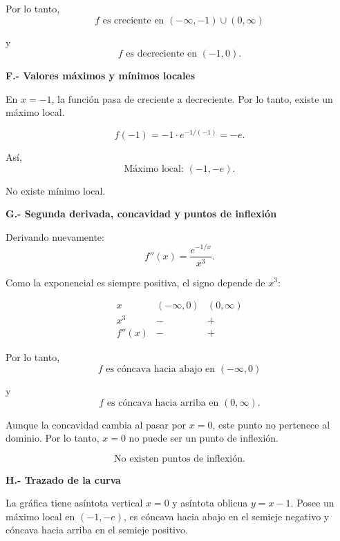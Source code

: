 \documentclass[12pt]{article}
\begin{document}
\begin{enumerate}[label=\alph*.-]
    Por lo tanto,
    \[
    \boxed{
    f\text{ es creciente en }(-\infty,-1)\cup(0,\infty)
    }
    \]

    y
    \[
    \boxed{
    f\text{ es decreciente en }(-1,0).
    }
    \]

    \textbf{F.- Valores máximos y mínimos locales}

    En $x=-1$, la función pasa de creciente a decreciente. Por lo tanto,
    existe un máximo local.

    \[
    f(-1)
    =
    -1\cdot e^{-1/(-1)}
    =
    -e.
    \]

    Así,
    \[
    \boxed{
    \text{Máximo local: }(-1,-e)
    }.
    \]

    No existe mínimo local.

    \textbf{G.- Segunda derivada, concavidad y puntos de inflexión}

    Derivando nuevamente:
    \[
    f''(x)=\frac{e^{-1/x}}{x^3}.
    \]

    Como la exponencial es siempre positiva, el signo depende de $x^3$:

    \[
    \begin{array}{c|cc}
    x & (-\infty,0) & (0,\infty)\\
    \hline
    x^3 & - & +\\
    \hline
    f''(x) & - & +
    \end{array}
    \]

    Por lo tanto,
    \[
    \boxed{
    f\text{ es cóncava hacia abajo en }(-\infty,0)
    }
    \]

    y
    \[
    \boxed{
    f\text{ es cóncava hacia arriba en }(0,\infty).
    }
    \]

    Aunque la concavidad cambia al pasar por $x=0$, este punto no
    pertenece al dominio. Por lo tanto, $x=0$ no puede ser un punto
    de inflexión.

    \[
    \boxed{\text{No existen puntos de inflexión.}}
    \]

    \textbf{H.- Trazado de la curva}

    La gráfica tiene asíntota vertical $x=0$ y asíntota oblicua
    $y=x-1$. Posee un máximo local en $(-1,-e)$, es cóncava hacia abajo
    en el semieje negativo y cóncava hacia arriba en el semieje positivo.


\end{enumerate}
\end{document}

